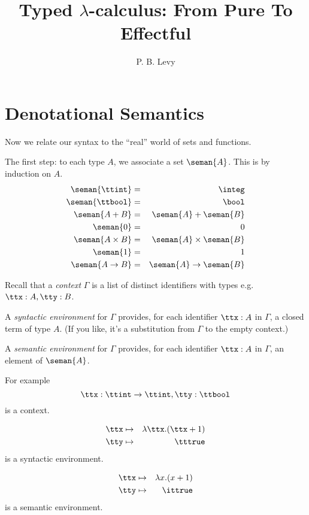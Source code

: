 \documentclass[runningheads,12pt]{llncs}
\title{Typed $\lambda$-calculus: From Pure To Effectful}
\author{P. B.  Levy}
\institute{University of Birmingham}
\begin{document}
\maketitle

\section{Denotational Semantics}

Now we relate our syntax to the ``real'' world of sets and functions.

The first step: to each type $A$, we associate a set $\seman{A}$.  This is by induction on $A$.
\begin{eqnarray*}
  \seman{\ttint} & = & \integ \\
  \seman{\ttbool} & = & \bool \\
  \seman{A+B} & = & \seman{A} + \seman{B} \\
 \seman{0} & = & 0 \\
\seman{A \times B} & = &  \seman{A} \times \seman{B} \\
\seman{1} & = & 1 \\
  \seman{A\rightarrow B} & = & \seman{A} \rightarrow \seman{B} 
\end{eqnarray*}

Recall that a \emph{context} $\Gamma$ is a list of distinct identifiers with types e.g.\ $\ttx:A, \tty:B$.

A \emph{syntactic environment} for $\Gamma$ provides, for each identifier $\ttx:A$ in $\Gamma$, a closed term of type $A$.   (If you like, it's a substitution from $\Gamma$ to the empty context.)

A \emph{semantic environment} for $\Gamma$ provides, for each identifier $\ttx:A$ in $\Gamma$, an element of $\seman{A}$.

For example
\begin{displaymath}
  \ttx: \ttint \rightarrow \ttint, \tty:\ttbool
\end{displaymath}
is a context.

\begin{eqnarray*}
  \ttx & \mapsto & \lambda \ttx. (\ttx + 1) \\
 \tty & \mapsto & \tttrue
\end{eqnarray*}
is a syntactic environment.

\begin{eqnarray*}
  \ttx & \mapsto & \lambda x. (x + 1) \\
 \tty & \mapsto & \ittrue
\end{eqnarray*}
is a semantic environment.
\end{document}

